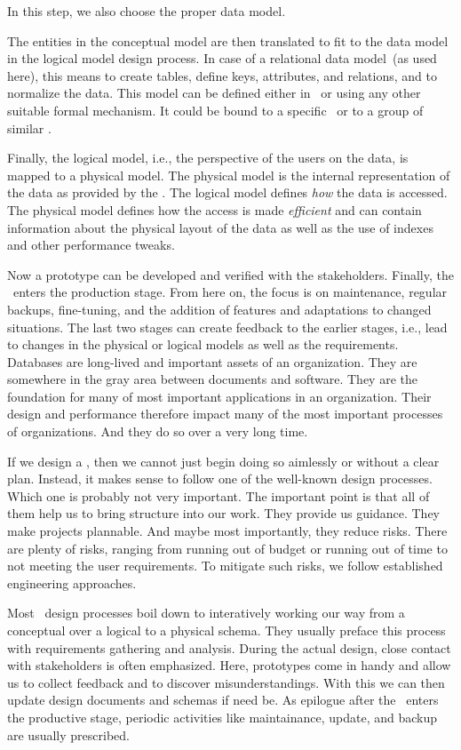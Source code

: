 In this step, we also choose the proper data model.

The entities in the conceptual model are then translated to fit to the data model in the logical model design process.
In case of a relational data model~(as used here), this means to create tables, define keys, attributes, and relations, and to normalize the data.
This model can be defined either in \sql\ or using any other suitable formal mechanism.
It could be bound to a specific \dbms\ or to a group of similar .

Finally, the logical model, i.e., the perspective of the users on the data, is mapped to a physical model.
The physical model is the internal representation of the data as provided by the \dbms.
The logical model defines \emph{how} the data is accessed.
The physical model defines how the access is made \emph{efficient} and can contain information about the physical layout of the data as well as the use of indexes and other performance tweaks.

Now a prototype can be developed and verified with the stakeholders.
Finally, the \db\ enters the production stage.
From here on, the focus is on maintenance, regular backups, fine-tuning, and the addition of features and adaptations to changed situations.
The last two stages can create feedback to the earlier stages, i.e., lead to changes in the physical or logical models as well as the requirements.
%
\FloatBarrier%
\endhsection%
%
%
Databases are long-lived and important assets of an organization.
They are somewhere in the gray area between documents and software.
They are the foundation for many of most important applications in an organization.
Their design and performance therefore impact many of the most important processes of organizations.
And they do so over a very long time.

If we design a \db, then we cannot just begin doing so aimlessly or without a clear plan.
Instead, it makes sense to follow one of the well-known design processes.
Which one is probably not very important.
The important point is that all of them help us to bring structure into our work.
They provide us guidance.
They make projects plannable.
And maybe most importantly, they reduce risks.
There are plenty of risks, ranging from running out of budget or running out of time to not meeting the user requirements.
To mitigate such risks, we follow established engineering approaches.

Most \db\ design processes boil down to interatively working our way from a conceptual over a logical to a physical schema.
They usually preface this process with requirements gathering and analysis.
During the actual design, close contact with stakeholders is often emphasized.
Here, prototypes come in handy and allow us to collect feedback and to discover misunderstandings.
With this we can then update design documents and schemas if need be.
As epilogue after the \db\ enters the productive stage, periodic activities like maintainance, update, and backup are usually prescribed.

